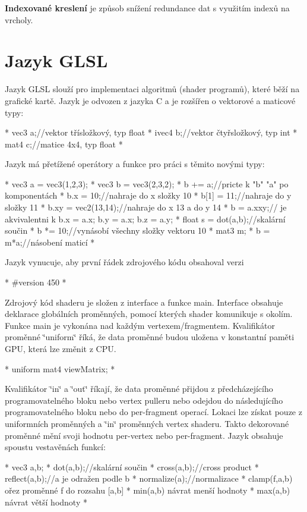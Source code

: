 {\bfseries Indexované kreslení} je způsob snížení redundance dat s využitím indexů na vrcholy. \hypertarget{index_glsl}{}\section{Jazyk G\-L\-S\-L}\label{index_glsl}
Jazyk G\-L\-S\-L slouží pro implementaci algoritmů (shader programů), které běží na grafické kartě. Jazyk je odvozen z jazyka C a je rozšířen o vektorové a maticové typy\-: \begin{DoxyVerb}* vec3 a;//vektor třísložkový, typ float
* ivec4 b;//vektor čtyřsložkový, typ int
* mat4 c;//matice 4x4, typ float
* \end{DoxyVerb}
 Jazyk má přetížené operátory a funkce pro práci s těmito novými typy\-: \begin{DoxyVerb}* vec3 a = vec3(1,2,3);
* vec3 b = vec3(2,3,2);
* b += a;//pricte k "b" "a" po komponentách
* b.x = 10;//nahraje do x složky 10
* b[1] = 11;//nahraje do y složky 11
* b.xy = vec2(13,14);//nahraje do x 13 a do y 14
* b = a.xxy;// je akvivalentni k b.x = a.x; b.y = a.x; b.z = a.y;
* float s = dot(a,b);//skalární součin
* b *= 10;//vynásobí všechny složky vektoru 10
* mat3 m;
* b = m*a;//násobení maticí
* \end{DoxyVerb}
 Jazyk vynucuje, aby první řádek zdrojového kódu obsahoval verzi \begin{DoxyVerb}* #version 450
* \end{DoxyVerb}
 Zdrojový kód shaderu je složen z interface a funkce main. Interface obsahuje deklarace globálních proměnných, pomocí kterých shader komunikuje s okolím. Funkce main je vykonána nad každým vertexem/fragmentem. Kvalifikátor proměnné \char`\"{}uniform\char`\"{} říká, že data proměnné budou uložena v konstantní paměti G\-P\-U, která lze změnit z C\-P\-U. \begin{DoxyVerb}* uniform mat4 viewMatrix;
* \end{DoxyVerb}
 Kvalifikátor \char`\"{}in\char`\"{} a \char`\"{}out\char`\"{} říkají, že data proměnné přijdou z předcházejícího programovatelného bloku nebo vertex pulleru nebo odejdou do následujícího programovatelného bloku nebo do per-\/fragment operací. Lokaci lze získat pouze z uniformních proměnných a \char`\"{}in\char`\"{} proměnných vertex shaderu. Takto dekorované proměnné mění svoji hodnotu per-\/vertex nebo per-\/fragment. Jazyk obsahuje spoustu vestavěnách funkcí\-: \begin{DoxyVerb}* vec3 a,b;
* dot(a,b);//skalární součin
* cross(a,b);//cross product
* reflect(a,b);//a je odražen podle b
* normalize(a);//normalizace
* clamp(f,a,b) ořez proměnné f do rozsahu [a,b]
* min(a,b) návrat menší hodnoty
* max(a,b) návrat větší hodnoty
* \end{DoxyVerb}

